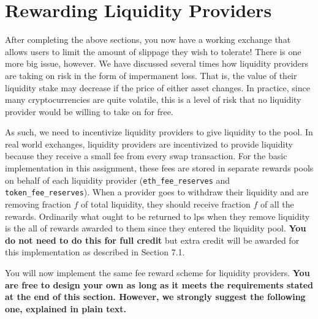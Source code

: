 \documentclass[11pt]{article}
\begin{document}
\section{Rewarding Liquidity Providers}

After completing the above sections, you now have a working exchange that allows users to limit the amount of slippage they wish to tolerate! There is one more big issue, however. We have discussed several times how liquidity providers are taking on risk in the form of impermanent loss. That is, the value of their liquidity stake may decrease if the price of either asset changes. In practice, since many cryptocurrencies are quite volatile, this is a level of risk that no liquidity provider would be willing to take on for free.

As such, we need to incentivize liquidity providers to give liquidity to the pool. In real world exchanges, liquidity providers are incentivized to provide liquidity because they receive a small fee from every swap transaction. For the basic implementation in this assignment, these fees are stored in separate rewards pools on behalf of each liquidity provider (\texttt{eth\_fee\_reserves} and \texttt{token\_fee\_reserves}). When a provider goes to withdraw their liquidity and are removing fraction $f$ of total liquidity, they should receive fraction $f$ of all the rewards.
Ordinarily what ought to be returned to lps when they remove liquidity is the all of rewards awarded to them since they entered the liquidity pool. \textbf{You do not need to do this for full credit} but extra credit will be awarded for this implementation as described in Section 7.1.

You will now implement the same fee reward scheme for liquidity providers. \textbf{You are free to design your own as long as it meets the requirements stated at the end of this section. However, we strongly suggest the following one, explained in plain text.} 
\end{document}
